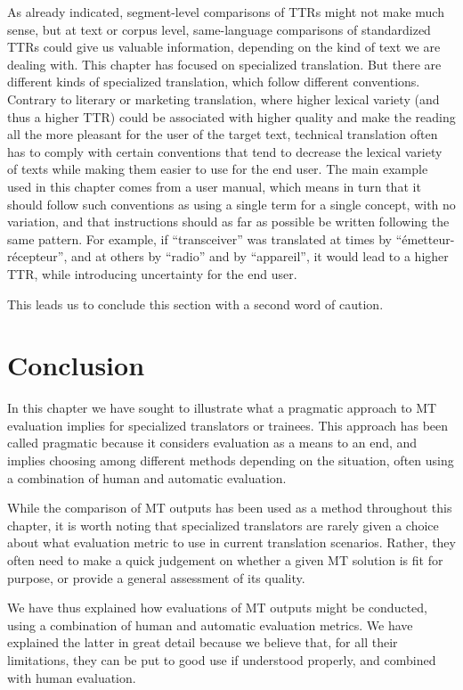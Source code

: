 \documentclass[output=paper]{langscibook}
\begin{document}
As already indicated, segment-level comparisons of TTRs might not make much sense, but at text or corpus level, same-language comparisons of standardized TTRs could give us valuable information, depending on the kind of text we are dealing with. This chapter has focused on specialized translation. But there are different kinds of specialized translation, which follow different conventions. Contrary to literary or marketing translation, where higher lexical variety (and thus a higher TTR) could be associated with higher quality and make the reading all the more pleasant for the user of the target text, technical translation often has to comply with certain conventions that tend to decrease the lexical variety of texts while making them easier to use for the end user. The main example used in this chapter comes from a user manual, which means in turn that it should follow such conventions as using a single term for a single concept, with no variation, and that instructions should as far as possible be written following the same pattern. For example, if “transceiver” was translated at times by “émetteur-récepteur”, and at others by “radio” and by “appareil”, it would lead to a higher TTR, while introducing uncertainty for the end user.

This leads us to conclude this section with a second word of caution.

\section{Conclusion}

In this chapter we have sought to illustrate what a pragmatic approach to MT evaluation implies for specialized translators or trainees. This approach has been called pragmatic because it considers evaluation as a means to an end, and implies choosing among different methods depending on the situation, often using a combination of human and automatic evaluation.

While the comparison of MT outputs has been used as a method throughout this chapter, it is worth noting that specialized translators are rarely given a choice about what evaluation metric to use in current translation scenarios. Rather, they often need to make a quick judgement on whether a given MT solution is fit for purpose, or  provide a general assessment of its quality.

We have thus explained how evaluations of MT outputs might be conducted, using a combination of human and automatic evaluation metrics. We have explained the latter in great detail because we believe that, for all their limitations, they can be put to good use if understood properly, and combined with human evaluation. 


\sloppy
\printbibliography[heading=subbibliography,notkeyword=this]
\end{document}
